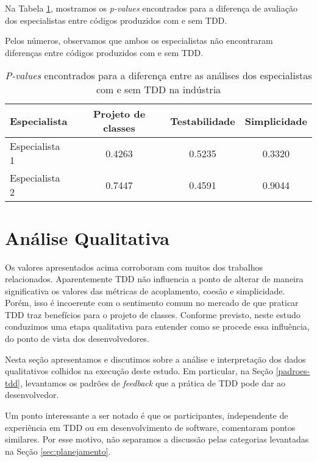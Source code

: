 \documentclass[conference]{IEEEtran}
\begin{document}
Na Tabela
\ref{tab:especialistas-industria},
mostramos os \textit{p-values} encontrados para a diferença de avaliação dos especialistas
entre códigos produzidos com e sem TDD.

Pelos números, observamos que ambos os especialistas não encontraram diferenças 
entre códigos produzidos com e sem TDD. 

\begin{table}[h!]
	\centering
	\begin{tabular}{| p{2cm} | c | c | c | }
		\hline
		Especialista & Projeto de classes & Testabilidade & Simplicidade\\
		\hline
		Especialista 1 &	0.4263 &	0.5235 &	0.3320\\
		Especialista 2 &	0.7447 &	0.4591 &	0.9044\\
		\hline
	\end{tabular}
	\caption{\textit{P-values} encontrados para a diferença entre as análises dos especialistas com e sem TDD na indústria}
	\label{tab:especialistas-industria}
\end{table}

\section{Análise Qualitativa}

Os valores apresentados acima corroboram com muitos dos trabalhos relacionados. 
Aparentemente TDD não influencia a ponto de alterar 
de maneira significativa os valores das métricas de acoplamento, coesão e simplicidade.
Porém, isso é incoerente com o sentimento comum no mercado de que praticar TDD
traz benefícios para o projeto de classes. Conforme previsto, neste estudo conduzimos
uma etapa qualitativa para entender como se procede essa influência, do ponto
de vista dos desenvolvedores.

Nesta seção apresentamos e discutimos sobre a análise e interpretação dos dados qualitativos colhidos
na execução deste estudo. Em particular, na Seção 
\ref{padroes-tdd}, levantamos os padrões de \textit{feedback} que a prática de TDD
pode dar ao desenvolvedor.

Um ponto interessante a ser notado é que os participantes, independente de experiência
em TDD ou em desenvolvimento de software, comentaram pontos similares. Por esse motivo,
não separamos a discussão pelas categorias levantadas na Seção \ref{sec:planejamento}.
\end{document}
